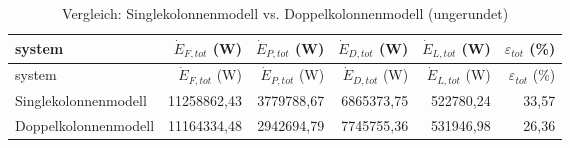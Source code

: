 \begin{longtable}{lrrrrr}
\caption{Vergleich: Singlekolonnenmodell vs. Doppelkolonnenmodell (ungerundet)} \\
\hline
system & $\dot{E}_{F,tot}$ (W) & $\dot{E}_{P,tot}$ (W) & $\dot{E}_{D,tot}$ (W) & $\dot{E}_{L,tot}$ (W) & $\varepsilon_{tot}$ (\%)  \\
\hline
\endfirsthead

\hline
system & $\dot{E}_{F,tot}$ (W) & $\dot{E}_{P,tot}$ (W) & $\dot{E}_{D,tot}$ (W) & $\dot{E}_{L,tot}$ (W) & $\varepsilon_{tot}$ (\%)  \\
\hline
\endhead

\hline
\endfoot

\hline
\endlastfoot

Singlekolonnenmodell & 11258862,43 & 3779788,67 & 6865373,75 & 522780,24 & 33,57 \\
Doppelkolonnenmodell & 11164334,48 & 2942694,79 & 7745755,36 & 531946,98 & 26,36 \\
\hline
\end{longtable}
